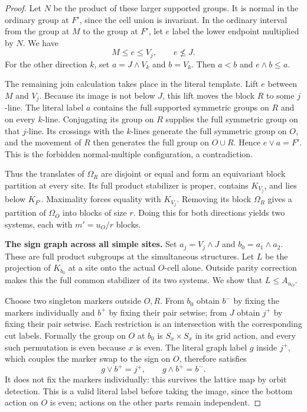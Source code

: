 \begin{proof}
Let \(N\) be the product of these larger supported groups.  It is
normal in the ordinary group at \(F'\), since the cell union is
invariant.  In the ordinary interval from the group at \(M\) to
the group at \(F'\), let \(e\) label the lower endpoint multiplied
by \(N\).  We have
\[
 M\le e\le V_j,\qquad e\not\le J.
\]
For the other direction \(k\), set \(a=J\wedge V_k\) and
\(b=V_k\).  Then \(a<b\) and \(e\wedge b\le a\).

The remaining join calculation takes place in the literal template.
Lift \(e\) between \(M\) and \(V_j\).  Because its image is not
below \(J\), this lift moves the block \(R\) to some \(j\)-line.
The literal label \(a\) contains the full supported symmetric
groups on \(R\) and on every \(k\)-line.  Conjugating its group on
\(R\) supplies the full symmetric group on that \(j\)-line.
Its crossings with the \(k\)-lines generate the full symmetric
group on \(O\), and the movement of \(R\) then generates the full
group on \(O\cup R\).  Hence \(e\vee a=F'\).  This is the
forbidden normal-multiple configuration, a contradiction.

Thus the translates of \(\Omega_R\) are disjoint or equal and
form an equivariant block partition at every site.  Its full product
stabilizer is proper, contains \(K_{V_j}\), and lies below \(K_{F'}\).
Maximality forces equality with \(K_{V_j}\).  Removing its block
\(\Omega_R\) gives a partition of \(\Omega_O\) into blocks of
size \(r\).  Doing this for both directions yields two systems,
each with \(m'=u_O/r\) blocks.

\noindent\textbf{The sign graph across all simple sites.}
Set \(a_j=V_j\wedge J\) and \(b_0=a_1\wedge a_2\).  These are full product
subgroups at the simultaneous structures.  Let \(L\) be the projection of
\(K_{b_0}\) at a site onto the actual \(O\)-cell alone.  Outside parity
correction makes this the full common stabilizer of its two systems.
We show that \(L\le A_{u_O}\).

Choose two singleton markers outside \(O,R\).  From \(b_0\) obtain \(b^-\)
by fixing the markers individually and \(b^+\) by fixing their pair setwise;
from \(J\) obtain \(j^+\) by fixing their pair setwise.  Each restriction is
an intersection with the corresponding cut labels.  Formally the group on
\(O\) at \(b_0\) is \(S_x\times S_x\) in its grid action, and every such
permutation is even because \(x\) is even.  The literal graph label \(g\)
inside \(j^+\), which couples the marker swap to the sign on \(O\), therefore
satisfies
\begin{equation}\label{t:weighted-parity-equalities}
 g\vee b^+=j^+,\qquad g\wedge b^+=b^-.
\end{equation}
It does not fix the markers individually: this survives the lattice map
by orbit detection.  This is a valid literal label before taking the
image, since the bottom action on \(O\) is even; actions on the other parts
remain independent.


\end{proof}
